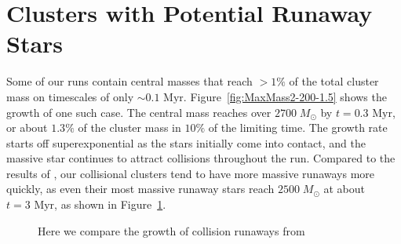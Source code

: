 \documentclass{princeton_astro_thesis}
\newcommand\Msun{\; M_\odot}
\newcommand\msun{\; M_\odot}
\newcommand\Myr{\mbox{ Myr}}
\numberwithin{equation}{section}
\begin{document}
\section{Clusters with Potential Runaway Stars}
Some of our runs contain central masses that reach $> 1\%$ of the total cluster mass on timescales of only $\sim 0.1 \Myr$.  Figure~\ref{fig:MaxMass2-200-1.5} shows the growth of one such case. The central mass reaches over $2700 \Msun$ by $t = 0.3 \Myr$, or about $1.3 \%$ of the cluster mass in $10\%$ of the limiting time. The growth rate starts off superexponential as the stars initially come into contact, and the massive star continues to attract collisions throughout the run.  Compared to the results of \citet{2004SPZ}, our collisional clusters tend to have more massive runaways more quickly, as even their most massive runaway stars reach $2500 \msun$ at about $t = 3 \Myr$, as shown in Figure~\ref{fig:CompareGrowth}.
\begin{figure}%
    \centering
    \qquad   
    \caption{Here we compare the growth of collision runaways from }
    \label{fig:CompareGrowth}
\end{figure}
\end{document}
